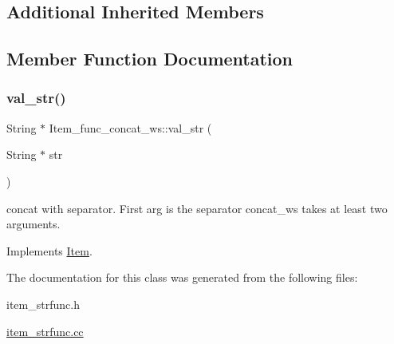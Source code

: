 \subsection*{Additional Inherited Members}


\subsection{Member Function Documentation}
\mbox{\label{classItem__func__concat__ws_a2ed0538e7772c8ace7b1cf049b200111}} 
\subsubsection{\texorpdfstring{val\+\_\+str()}{val\_str()}}
{\footnotesize\ttfamily String $\ast$ Item\+\_\+func\+\_\+concat\+\_\+ws\+::val\+\_\+str (\begin{DoxyParamCaption}\item[{String $\ast$}]{str }\end{DoxyParamCaption})\hspace{0.3cm}{\ttfamily [virtual]}}

concat with separator. First arg is the separator concat\+\_\+ws takes at least two arguments. 

Implements \mbox{\hyperlink{classItem}{Item}}.



The documentation for this class was generated from the following files\+:\begin{DoxyCompactItemize}
\item 
item\+\_\+strfunc.\+h\item 
\mbox{\hyperlink{item__strfunc_8cc}{item\+\_\+strfunc.\+cc}}\end{DoxyCompactItemize}
